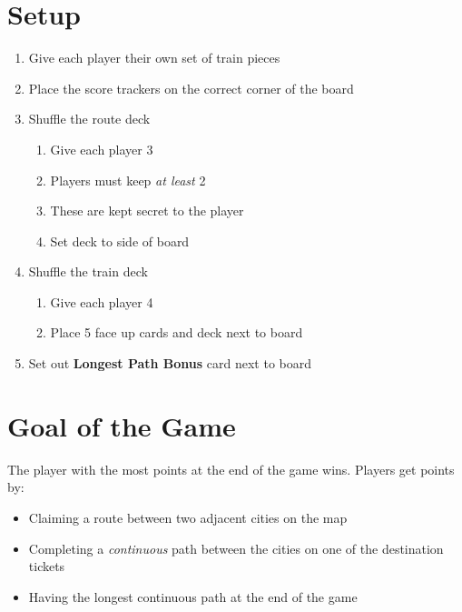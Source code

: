 \documentclass[12pt]{article}
\newenvironment{enumerateCustom}
{\begin{enumerate}
  \setlength{\itemsep}{1pt}
  \setlength{\parskip}{0pt}
  \setlength{\parsep}{0pt}}
{\end{enumerate}}
\newenvironment{itemizeCustom}
{\begin{itemize}
  \setlength{\itemsep}{1pt}
  \setlength{\parskip}{0pt}
  \setlength{\parsep}{0pt}}
{\end{itemize}}
\begin{document}
\begin{mdframed}[style = customFrame]
\begin{multicols*}{2}

\section*{Setup}
\begin{enumerateCustom} 
	\item Give each player their own set of train pieces
	\item Place the score trackers on the correct corner of the board
	\item Shuffle the route deck
		\begin{enumerateCustom}
			\item Give each player 3
			\item Players must keep \emph{at least} 2
			\item These are kept secret to the player
			\item Set deck to side of board
		\end{enumerateCustom}
	\item Shuffle the train deck
		\begin{enumerateCustom}
			\item Give each player 4
			\item Place 5 face up cards and deck next to board
		\end{enumerateCustom}
	\item Set out \textbf{Longest Path Bonus} card next to board
\end{enumerateCustom}

\section*{Goal of the Game}
The player with the most points at the end of the game wins. Players get points by:
\begin{itemizeCustom}
	\item Claiming a route between two adjacent cities on the map
	\item Completing a \emph{continuous} path between the cities on one of the destination tickets
	\item Having the longest continuous path at the end of the game
\end{itemizeCustom}


\end{multicols*}
\end{mdframed}
\end{document}
